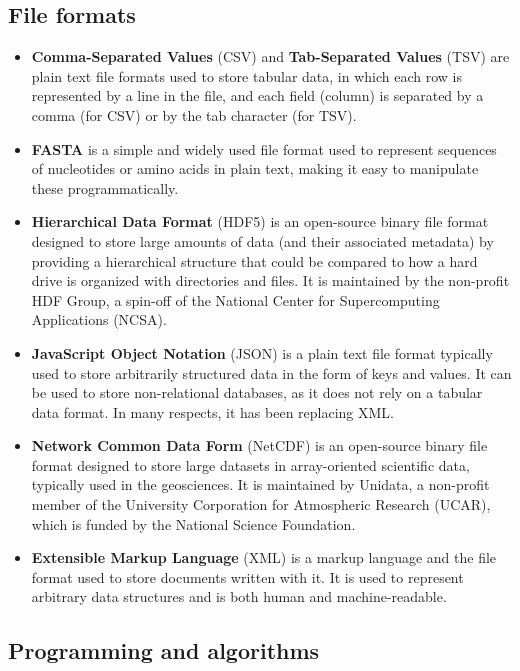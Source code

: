\documentclass[10pt,letterpaper]{article}
\begin{document}
\subsection*{File formats}\label{file-formats}

\begin{itemize}
\item
  \textbf{Comma-Separated Values} (CSV) and \textbf{Tab-Separated
  Values} (TSV) are plain text file formats used to store tabular data,
  in which each row is represented by a line in the file, and each field
  (column) is separated by a comma (for CSV) or by the tab character
  (for TSV).
\item
  \textbf{FASTA} is a simple and widely used file format used to
  represent sequences of nucleotides or amino acids in plain text,
  making it easy to manipulate these programmatically.
\item
  \textbf{Hierarchical Data Format} (HDF5) is an open-source binary file
  format designed to store large amounts of data (and their associated
  metadata) by providing a hierarchical structure that could be compared
  to how a hard drive is organized with directories and files. It is
  maintained by the non-profit HDF Group, a spin-off of the National
  Center for Supercomputing Applications (NCSA).
\item
  \textbf{JavaScript Object Notation} (JSON) is a plain text file format
  typically used to store arbitrarily structured data in the form of
  keys and values. It can be used to store non-relational databases, as
  it does not rely on a tabular data format. In many respects, it has
  been replacing XML.
\item
  \textbf{Network Common Data Form} (NetCDF) is an open-source binary
  file format designed to store large datasets in array-oriented
  scientific data, typically used in the geosciences. It is maintained
  by Unidata, a non-profit member of the University Corporation for
  Atmospheric Research (UCAR), which is funded by the National Science
  Foundation.
\item
  \textbf{Extensible Markup Language} (XML) is a markup language and the
  file format used to store documents written with it. It is used to
  represent arbitrary data structures and is both human and
  machine-readable.
\end{itemize}

\subsection*{Programming and
algorithms}\label{programming-and-algorithms}
\end{document}
